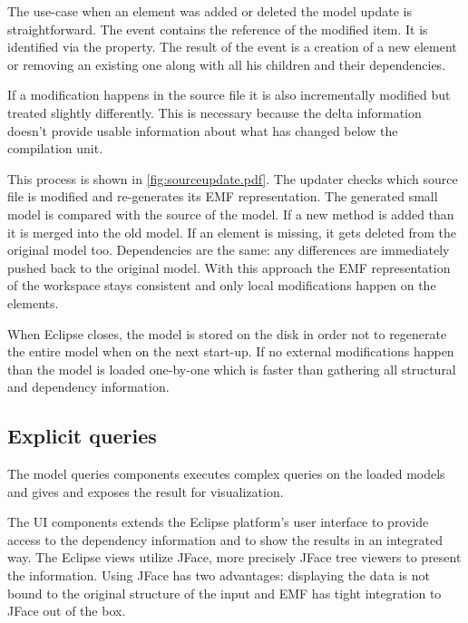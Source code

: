The use-case when an element was added or deleted the model update is
straightforward. The event contains the reference of the modified item. It is
identified via the  property. The result of the event is a
creation of a new element or removing an existing one along with all his
children and their dependencies.

If a modification happens in the source file it is also incrementally modified
but treated slightly differently. This is necessary because the delta
information doesn't provide usable information about what has changed below the
compilation unit.


This process is shown in \autoref{fig:sourceupdate.pdf}. The updater checks
which source file is modified and re-generates its EMF representation. The
generated small model is compared with the source of the model. If a new method
is added than it is merged into the old model. If an element is missing, it gets
deleted from the original model too. Dependencies are the same: any differences
are immediately pushed back to the original model. With this approach the EMF
representation of the workspace stays consistent and only local modifications
happen on the elements.

When Eclipse closes, the model is stored on the disk in order not to regenerate
the entire model when on the next start-up. If no external modifications happen
than the model is loaded one-by-one which is faster than gathering all
structural and dependency information.

\subsection{Explicit queries}
\label{sect:elabexplicit}
The model queries components executes complex queries on the loaded models and
gives and exposes the result for  visualization. 



The UI components extends the Eclipse platform's user interface to provide
access to the dependency information and to show the results in an integrated
way. The Eclipse views utilize JFace, more precisely JFace tree viewers to present
the information. Using JFace has two advantages: displaying the data is not
bound to the original structure of the input and EMF has tight integration to
JFace out of the box.

